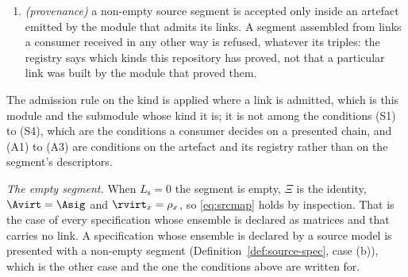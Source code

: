 \begin{definition}
\begin{enumerate}[label=(A\arabic*),leftmargin=3.0em]
declared strings, taken entry by entry --- and unless every assumption of that
entry is in the artefact's assumption ledger, the list of assumptions the
artefact rests on. \emph{Both components of
$\mathcal{A}(\textsf{kind})$ are compared}, so a link that names the soundness
claim's closure and omits the model's attestation is refused exactly as one
that names neither. A link supplying its channel as data carries no obligation
record and is decided by (S3) instead.
\item \emph{(provenance)} a non-empty source segment is accepted only inside
an artefact emitted by the module that admits its links. A segment assembled
from links a consumer received in any other way is refused, whatever its
triples: the registry says which kinds this repository has proved, not that a
particular link was built by the module that proved them.
\end{enumerate}
The admission rule on the kind is applied where a link is admitted, which is
this module and the submodule whose kind it is; it is not among the conditions
(S1) to (S4), which are the conditions a consumer decides on a presented
chain, and (A1) to (A3) are conditions on the artefact and its registry rather
than on the segment's descriptors.

\emph{The empty segment.} When $L_{\mathrm s}=0$ the segment is empty, $\Xi$
is the identity, $\Avirt=\Asig$ and $\rvirt_x=\rho_x$, so \eqref{eq:srcmap}
holds by inspection. That is the case of every specification whose ensemble
is declared as matrices and that carries no link. A specification whose
ensemble is declared by a source model is presented with a non-empty segment
(Definition~\ref{def:source-spec}, case (b)), which is the other case and the
one the conditions above are written for.
\end{definition}

